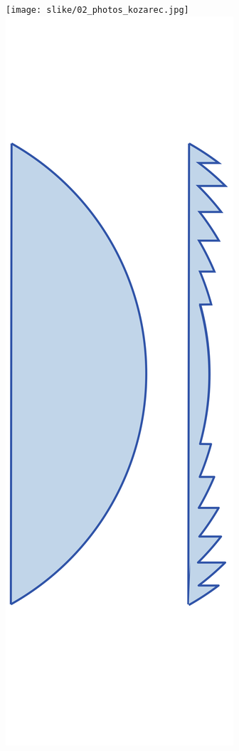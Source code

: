 \begin{figure}[!htp]
\centering
\texttt{[image: slike/02\_photos\_kozarec.jpg]}\hfill
\includegraphics[height=7truecm]{slike/02_FresnelLeca.png}\hfill

\end{figure}

